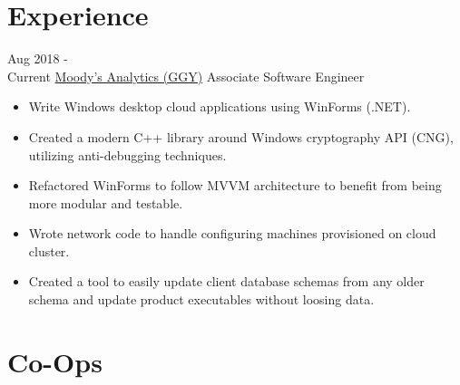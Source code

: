 \documentclass[letterpaper]{twentysecondcv} %
\begin{document}
\makeprofile %


\section{Experience}

\begin{twenty} %
		\twentyitem
    	{Aug 2018 -\\Current}
        {\href{https://www.ggy.com/}{Moody's Analytics (GGY)}}
        {Associate Software Engineer}
        {}
        {
        {\begin{itemize}
        \item Write Windows desktop cloud applications using WinForms (.NET).
        \item Created a modern C++ library around Windows cryptography API (CNG), utilizing anti-debugging techniques.
        \item Refactored WinForms to follow MVVM architecture to benefit from being more modular and testable.
        \item Wrote network code to handle configuring machines provisioned on cloud cluster.
        \item Created a tool to easily update client database schemas from any older schema and update product executables without loosing data.
    \end{itemize}}
        }
\end{twenty}

\section{Co-Ops}
\end{document}
